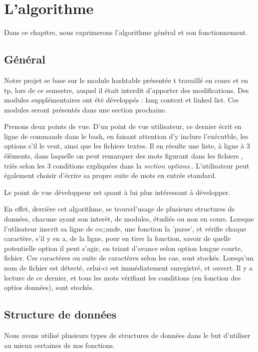 \documentclass[12pt, letterpaper]{report}
\begin{document}
\chapter{L'algorithme}
Dans ce chapitre, nous exprimerons l'algorithme général
 et son fonctionnement. 

\section{Général}
Notre projet se base sur le module hashtable
présentée t travaillé en cours et en tp,
lors de ce semestre, auquel il était interdit d'apporter
des modifications.
Des modules supplémentaires ont été développés : lang context et linked list.
Ces modules seront présentés dans une section prochaine.

Prenons deux points de vue. D'un point de vue utilisateur, ce dernier écrit en ligne de commande dans le bash, en faisant attention d'y inclure
l'exécutble, les options s'il le veut, ainsi que les fichiers textes.
Il en résulte une liste, à ligne à 3
éléments, dans laquelle on peut remarquer des mots figurant dans les fichiers
, triés selon les 3 conditions expliquées dans la \emph{section options.}.
L'utilisateur peut également choisir d'écrire sa propre suite de mots en 
entrée standard.

Le point de vue développeur est quant à lui plus intéressant
à développer. 

En effet, derrière cet algorithme, se trouvel'usage de plusieurs structures de données, chacune ayant son interèt, de modules, étudiés ou non en cours.
Lorsque l'utlisateur inscrit sa ligne de co;;ande, une fonction la 'parse', et vérifie
chaque caractère, s'il y en a, de la ligne, pour en tirer la fonction, savoir de quelle potentielle option il peut s'agir, en triant d'avance
selon option longue courte, fichier. 
Ces caractères ou suite de caractères selon les cas, sont stockés.
Lorsqu'un nom de fichier est détecté, celui-ci est immédiatement
enregistré, et ouvert. Il y a lecture de ce dernier, et tous les mots vérifiant les conditions (en fonction des optios données), sont stockés.



\section{Structure de données}

Nous avons utilisé plusieurs types de structures de données dans le but d'utiliser 
au mieux certaines de nos fonctions.
\end{document}
